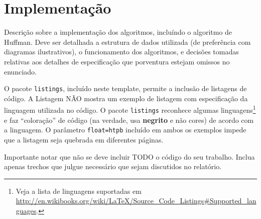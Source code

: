 \chapter{Implementação}
\label{sec-implementacao}


Descrição sobre a implementação dos algoritmos, incluíndo o algoritmo de Huffman. Deve ser detalhada a estrutura de dados utilizada (de preferência com diagramas ilustrativos), o funcionamento dos algoritmos, e decisões tomadas relativas aos detalhes de especificação que porventura estejam omissos no enunciado.


O pacote \texttt{listings}, incluído neste template, permite a inclusão de listagens de código.  A Listagem NÃO mostra um exemplo de listagem com especificação da linguagem utilizada no código. O pacote \texttt{listings} reconhece algumas linguagens\footnote{Veja a lista de linguagens suportadas em \url{http://en.wikibooks.org/wiki/LaTeX/Source\_Code\_Listings\#Supported_languages}.} e faz ``coloração'' de código (na verdade, usa \textbf{negrito} e não cores) de acordo com a linguagem. O parâmetro \texttt{float=htpb} incluído em ambos os exemplos impede que a listagem seja quebrada em diferentes páginas.

Importante notar que não se deve incluir TODO o código do seu trabalho. Inclua apenas trechos que julgue necessário que sejam discutidos no relatório.


% 
